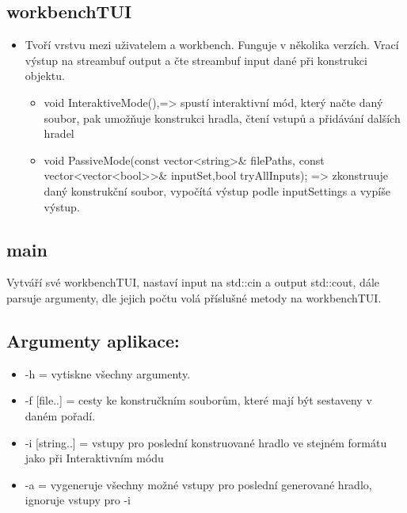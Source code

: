 \documentclass[12pt, oneside]{article}
\begin{document}
\subsection*{workbenchTUI} 
\begin{itemize} 
\item Tvoří vrstvu mezi uživatelem a workbench. Funguje v několika verzích. Vrací výstup na streambuf output a čte streambuf input  dané při konstrukci objektu.
\begin{itemize} 
\item void InteraktiveMode(),=> spustí interaktivní mód, který načte daný soubor, pak umožňuje konstrukci hradla, čtení vstupů a přidávání dalších hradel 
\item 	void PassiveMode(const vector<string>\& filePaths, const vector<vector<bool>>\& inputSet,bool tryAllInputs); => zkonstruuje daný konstrukční soubor, vypočítá výstup podle inputSettings a vypíše výstup. 
\end{itemize}
\end{itemize} 
\subsection*{main}
Vytváří své workbenchTUI, nastaví input na std::cin a output std::cout, dále parsuje argumenty, dle jejich počtu volá příslušné metody na workbenchTUI. 
\newpage
\subsection*{Argumenty aplikace:}
\begin{itemize} 
\item -h = vytiskne všechny argumenty. 
\item -f [file..] = cesty ke konstručkním souborům, které mají být sestaveny v daném pořadí. 
\item -i [string..] = vstupy pro poslední konstruované hradlo ve stejném formátu jako při Interaktivním módu 
\item -a = vygeneruje všechny možné vstupy pro  poslední generované hradlo, ignoruje vstupy pro -i
\end{itemize} 
\end{document}
